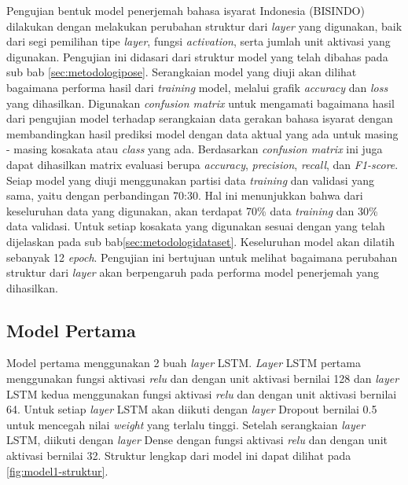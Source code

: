 Pengujian bentuk model penerjemah bahasa isyarat Indonesia (BISINDO) dilakukan dengan melakukan perubahan struktur dari \emph{layer} yang digunakan, baik dari segi pemilihan tipe \emph{layer}, fungsi \emph{activation}, serta jumlah unit aktivasi yang digunakan. Pengujian ini didasari dari struktur model yang telah dibahas pada sub bab \ref{sec:metodologipose}. Serangkaian model yang diuji akan dilihat bagaimana performa hasil dari \emph{training} model, melalui grafik \emph{accuracy} dan \emph{loss} yang dihasilkan. Digunakan \emph{confusion matrix} untuk mengamati bagaimana hasil dari pengujian model terhadap serangkaian data gerakan bahasa isyarat dengan membandingkan hasil prediksi model dengan data aktual yang ada untuk masing - masing kosakata atau \emph{class} yang ada. Berdasarkan \emph{confusion matrix} ini juga dapat dihasilkan matrix evaluasi berupa \emph{accuracy}, \emph{precision}, \emph{recall}, dan \emph{F1-score}. Seiap model yang diuji menggunakan partisi data \emph{training} dan validasi yang sama, yaitu dengan perbandingan 70:30. Hal ini menunjukkan bahwa dari keseluruhan data yang digunakan, akan terdapat 70\% data \emph{training} dan 30\% data validasi. Untuk setiap kosakata yang digunakan sesuai dengan yang telah dijelaskan pada sub bab\ref{sec:metodologidataset}. Keseluruhan model akan dilatih sebanyak 12 \emph{epoch}. Pengujian ini bertujuan untuk melihat bagaimana perubahan struktur dari \emph{layer} akan berpengaruh pada performa model penerjemah yang dihasilkan.

\subsection{Model Pertama}
\label{sec:analisismodel1}
Model pertama menggunakan 2 buah \emph{layer} LSTM. \emph{Layer} LSTM pertama menggunakan fungsi aktivasi \emph{relu} dan dengan unit aktivasi bernilai 128 dan \emph{layer} LSTM kedua menggunakan fungsi aktivasi \emph{relu} dan dengan unit aktivasi bernilai 64. Untuk setiap \emph{layer} LSTM akan diikuti dengan \emph{layer} Dropout bernilai 0.5 untuk mencegah nilai \emph{weight} yang terlalu tinggi. Setelah serangkaian \emph{layer} LSTM, diikuti dengan \emph{layer} Dense dengan fungsi aktivasi \emph{relu} dan dengan unit aktivasi bernilai 32. Struktur lengkap dari model ini dapat dilihat pada \ref{fig:model1-struktur}.


